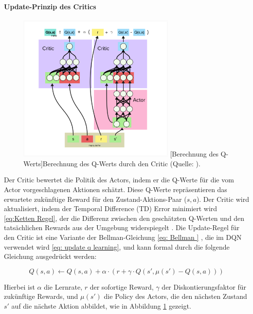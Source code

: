 \paragraph{Update-Prinzip des Critics}
\begin{figure}[htbp]
\centering
  \includegraphics[width=0.70\textwidth, trim=10px 10px 10px 10px, clip]{2Grundlagen/35Q_value_Critick.png}
  [Berechnung des Q-Werts]{Berechnung des Q-Werts durch den Critic (Quelle: \cite{wei2020ddpg}).}
  \label{fig:get_q_value_critic}
\end{figure}
Der Critic bewertet die Politik des Actors, indem er die Q-Werte für die vom Actor vorgeschlagenen Aktionen schätzt. Diese Q-Werte repräsentieren das erwartete zukünftige Reward für den Zustand-Aktions-Paar (\(s, a\)). Der Critic wird aktualisiert, indem der Temporal Difference (TD) Error minimiert wird \ref{eq:Ketten Regel},  der die Differenz zwischen den geschätzten Q-Werten und den tatsächlichen Rewards aus der Umgebung widerspiegelt \cite{Wu2018AggregatedMultiDDPG}. Die Update-Regel für den Critic ist eine Variante der Bellman-Gleichung \ref{eq: Bellman } , die im DQN verwendet wird \ref{eq: update q learning}, und kann formal durch die folgende Gleichung ausgedrückt werden:



\begin{equation}
		Q(s,a) \leftarrow Q(s,a) + \alpha \cdot (r + \gamma \cdot Q(s',\mu(s') - Q(s,a)))
		\label{eq:critick update}
\end{equation}

Hierbei ist \( \alpha \) die Lernrate, \( r \) der sofortige Reward, \( \gamma \) der Diskontierungsfaktor für zukünftige Rewards, und \( \mu(s') \) die Policy des Actors, die den nächsten Zustand \( s' \) auf die nächste Aktion abbildet, wie in Abbildung \ref{fig:get_q_value_critic} gezeigt.



